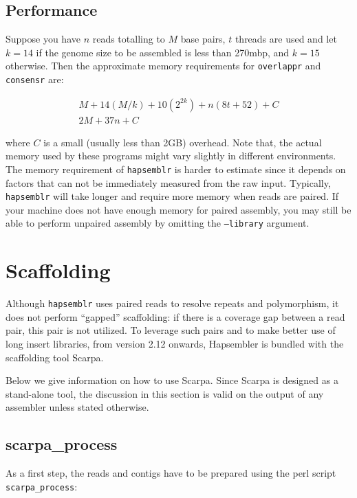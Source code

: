 \documentclass[12pt,a4paper]{report}
\newcommand{\hapversion}{2.12}
\begin{document}
\subsection{Performance}

Suppose you have $n$ reads totalling to $M$ base pairs, $t$ threads are used and let $k=14$ if the genome size to be assembled is less than 270mbp, and $k=15$ otherwise. Then the approximate memory requirements for \texttt{overlappr} and \texttt{consensr} are:

\begin{eqnarray}
M + 14(M/k) + 10(2^{2k}) + n(8t + 52) + C \\
2M + 37n + C
\end{eqnarray}

where $C$ is a small (usually less than 2GB) overhead. Note that, the actual memory used by these programs might vary slightly in different environments. The memory requirement of \texttt{hapsemblr} is harder to estimate since it depends on factors that can not be immediately measured from the raw input. Typically, \texttt{hapsemblr} will take longer and require more memory when reads are paired. If your machine does not have enough memory for paired assembly, you may still be able to perform unpaired assembly by omitting the \texttt{--library} argument.

\section{Scaffolding}
\label{scaff}

Although \texttt{hapsemblr} uses paired reads to resolve repeats and polymorphism, it does not perform ``gapped'' scaffolding: if there is a coverage gap between a read pair, this pair is not utilized. To leverage such pairs and to make better use of long insert libraries, from version \hapversion{} onwards, Hapsembler is bundled with the scaffolding tool Scarpa. 

Below we give information on how to use Scarpa. Since Scarpa is designed as a stand-alone tool, the discussion in this section is valid on the output of any assembler unless stated otherwise.

\subsection{scarpa\_process}

As a first step, the reads and contigs have to be prepared using the perl script \texttt{scarpa\_process}:
\end{document}
